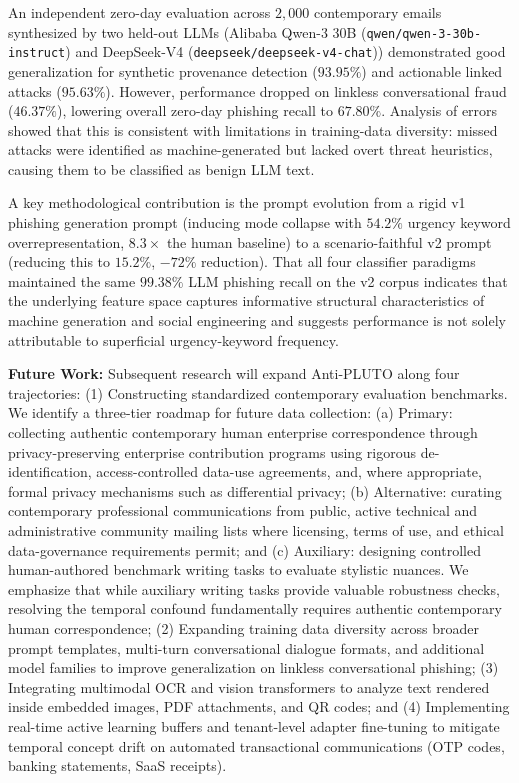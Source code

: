 \documentclass[journal]{IEEEtran}
\begin{document}
An independent zero-day evaluation across $2{,}000$ contemporary emails synthesized by two held-out LLMs (Alibaba Qwen-3 30B (\texttt{qwen/qwen-3-30b-instruct}) and DeepSeek-V4 (\texttt{deepseek/deepseek-v4-chat})) demonstrated good generalization for synthetic provenance detection ($93.95\%$) and actionable linked attacks ($95.63\%$). However, performance dropped on linkless conversational fraud ($46.37\%$), lowering overall zero-day phishing recall to $67.80\%$. Analysis of errors showed that this is consistent with limitations in training-data diversity: missed attacks were identified as machine-generated but lacked overt threat heuristics, causing them to be classified as benign LLM text.

A key methodological contribution is the prompt evolution from a rigid v1 phishing generation prompt (inducing mode collapse with $54.2\%$ urgency keyword overrepresentation, $8.3\times$ the human baseline) to a scenario-faithful v2 prompt (reducing this to $15.2\%$, $-72\%$ reduction). That all four classifier paradigms maintained the same $99.38\%$ LLM phishing recall on the v2 corpus indicates that the underlying feature space captures informative structural characteristics of machine generation and social engineering and suggests performance is not solely attributable to superficial urgency-keyword frequency.

\textbf{Future Work:} Subsequent research will expand Anti-PLUTO along four trajectories: (1) Constructing standardized contemporary evaluation benchmarks. We identify a three-tier roadmap for future data collection: (a) Primary: collecting authentic contemporary human enterprise correspondence through privacy-preserving enterprise contribution programs using rigorous de-identification, access-controlled data-use agreements, and, where appropriate, formal privacy mechanisms such as differential privacy; (b) Alternative: curating contemporary professional communications from public, active technical and administrative community mailing lists where licensing, terms of use, and ethical data-governance requirements permit; and (c) Auxiliary: designing controlled human-authored benchmark writing tasks to evaluate stylistic nuances. We emphasize that while auxiliary writing tasks provide valuable robustness checks, resolving the temporal confound fundamentally requires authentic contemporary human correspondence; (2) Expanding training data diversity across broader prompt templates, multi-turn conversational dialogue formats, and additional model families to improve generalization on linkless conversational phishing; (3) Integrating multimodal OCR and vision transformers to analyze text rendered inside embedded images, PDF attachments, and QR codes; and (4) Implementing real-time active learning buffers and tenant-level adapter fine-tuning to mitigate temporal concept drift on automated transactional communications (OTP codes, banking statements, SaaS receipts).


\balance


\end{document}
